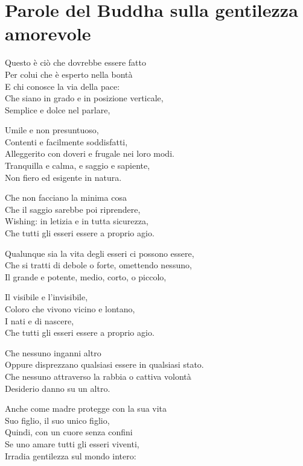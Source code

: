 \chapter{Parole del Buddha sulla gentilezza amorevole}

\begin{leader}
\end{leader}

Questo è ciò che dovrebbe essere fatto\\
Per colui che è esperto nella bontà\\
E chi conosce la via della pace:\\
Che siano in grado e in posizione verticale,\\
Semplice e dolce nel parlare,

Umile e non presuntuoso,\\
Contenti e facilmente soddisfatti,\\
Alleggerito con doveri e frugale nei loro modi.\\
Tranquilla e calma, e saggio e sapiente,\\
Non fiero ed esigente in natura.

Che non facciano la minima cosa\\
Che il saggio sarebbe poi riprendere,\\
Wishing: in letizia e in tutta sicurezza,\\
Che tutti gli esseri essere a proprio agio.

Qualunque sia la vita degli esseri ci possono essere,\\
Che si tratti di debole o forte, omettendo nessuno,\\
Il grande e potente, medio, corto, o piccolo,

Il visibile e l'invisibile,\\
Coloro che vivono vicino e lontano,\\
I nati e di nascere,\\
Che tutti gli esseri essere a proprio agio.

Che nessuno inganni altro\\
Oppure disprezzano qualsiasi essere in qualsiasi stato.\\
Che nessuno attraverso la rabbia o cattiva volontà\\
Desiderio danno su un altro.

Anche come madre protegge con la sua vita\\
Suo figlio, il suo unico figlio,\\
Quindi, con un cuore senza confini\\
Se uno amare tutti gli esseri viventi,\\
Irradia gentilezza sul mondo intero:

